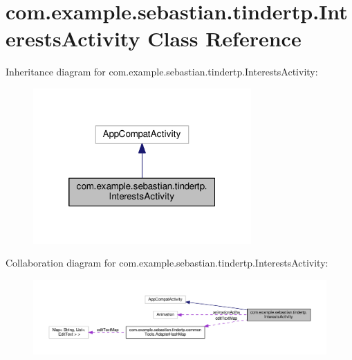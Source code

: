 \hypertarget{classcom_1_1example_1_1sebastian_1_1tindertp_1_1InterestsActivity}{}\section{com.\+example.\+sebastian.\+tindertp.\+Interests\+Activity Class Reference}
\label{classcom_1_1example_1_1sebastian_1_1tindertp_1_1InterestsActivity}


Inheritance diagram for com.\+example.\+sebastian.\+tindertp.\+Interests\+Activity\+:
\nopagebreak
\begin{figure}[H]
\begin{center}
\leavevmode
\includegraphics[width=236pt]{classcom_1_1example_1_1sebastian_1_1tindertp_1_1InterestsActivity__inherit__graph}
\end{center}
\end{figure}


Collaboration diagram for com.\+example.\+sebastian.\+tindertp.\+Interests\+Activity\+:
\nopagebreak
\begin{figure}[H]
\begin{center}
\leavevmode
\includegraphics[width=350pt]{classcom_1_1example_1_1sebastian_1_1tindertp_1_1InterestsActivity__coll__graph}
\end{center}
\end{figure}
